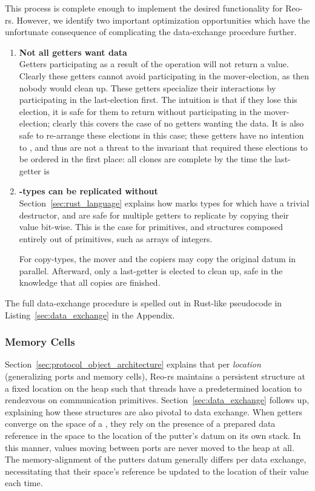 This process is complete enough to implement the desired functionality for \mbox{Reo-rs}. However, we identify two important optimization opportunities which have the unfortunate consequence of complicating the data-exchange procedure further.
\begin{enumerate}
	\item \textbf{Not all getters want data}\\
	Getters participating as a result of the  operation will not return a value. Clearly these getters cannot avoid participating in the mover-election, as then nobody would clean up. These getters specialize their interactions by participating in the last-election first. The intuition is that if they lose this election, it is safe for them to return without participating in the mover-election; clearly this covers the case of no getters wanting the data. It is also safe to re-arrange these elections in this case; these getters have no intention to , and thus are not a threat to the invariant that required these elections to be ordered in the first place: all clones are complete by the time the last-getter is
	
	\item \textbf{-types can be replicated without }\\
	Section~\ref{sec:rust_language} explains how  marks types for which have a trivial destructor, and are safe for multiple getters to replicate by copying their value bit-wise. This is the case for primitives, and structures composed entirely out of primitives, such as arrays of integers. 
	
	For copy-types, the mover and the copiers may copy the original datum in parallel. Afterward, only a last-getter is elected to clean up, safe in the knowledge that all copies are finished.
\end{enumerate}

The full data-exchange procedure is spelled out in Rust-like pseudocode in Listing~\ref{sec:data_exchange} in the Appendix.

\subsubsection{Memory Cells}
\label{sec:memory_cells}
Section~\ref{sec:protocol_object_architecture} explains that per \textit{location} (generalizing ports and memory cells), Reo-rs maintains a persistent  structure at a fixed location on the heap such that threads have a predetermined location to rendezvous on communication primitives. Section~\ref{sec:data_exchange} follows up, explaining how these structures are also pivotal to data exchange. When getters converge on the space of a , they rely on the presence of a prepared data reference in the space to the location of the putter's datum on its own stack. In this manner, values moving between ports are never moved to the heap at all. The memory-alignment of the putters datum generally differs per data exchange, necessitating that their space's reference be updated to the location of their value each time. 

